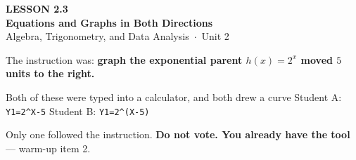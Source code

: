 \documentclass[aspectratio=169, 11pt]{beamer}
\begin{document}
{
\begin{frame}[plain]
  \vspace{2.8cm}\hspace{0.55cm}%
  \begin{minipage}{0.9\textwidth}
    {\color{goldacc}\bfseries\small LESSON 2.3}\\[0.5cm]
    {\color{white}\bfseries\LARGE Equations and Graphs in Both Directions}\\[1.2cm]
    {\color{mistmid}\small Algebra, Trigonometry, and Data Analysis~$\cdot$~Unit 2}
  \end{minipage}
\end{frame}
}

\begin{frame}[t, plain]
  The instruction was: \textbf{graph the exponential parent $h(x)=2^x$ moved $5$ units to the
  right.}
  \begin{block}{Both of these were typed into a calculator, and both drew a curve}
    \centering\large
    Student A: \texttt{Y1=2\^{}X-5} \qquad\qquad Student B: \texttt{Y1=2\^{}(X-5)}
  \end{block}
  \vspace{0.15cm}
  Only one followed the instruction. \textbf{Do not vote. You already have the tool} --- warm-up
  item 2.
\end{frame}
\end{document}
